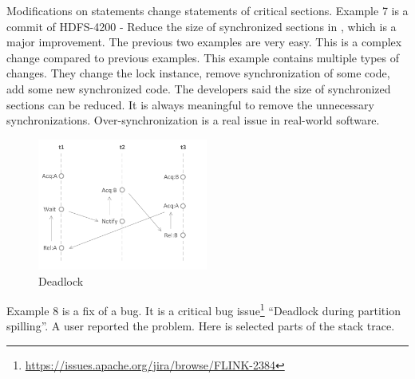 Modifications on statements change statements of critical sections. Example 7 is a commit of HDFS-4200 - Reduce the size of synchronized sections in , which is a major improvement. The previous two examples are very easy. This is a complex change compared to previous examples. This example contains multiple types of changes. They change the lock instance, remove synchronization of some code, add some new synchronized code. The developers said the size of synchronized sections can be reduced. It is always meaningful to remove the unnecessary synchronizations. Over-synchronization \cite{conf/sigsoft/GuJSZL15} is a real issue in real-world software.


\begin{figure}
	\centering
	\includegraphics[height=1.7in]{deadlock}
	\caption{Deadlock}
	\label{figure:deadlock}
\end{figure}



Example 8 is a fix of a bug. It is a critical bug issue\footnote{\url{https://issues.apache.org/jira/browse/FLINK-2384}} ``Deadlock during partition spilling''. A user reported the problem. Here is selected parts of the stack trace.

